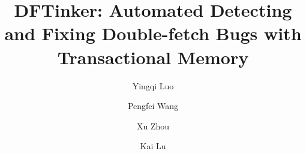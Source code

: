 \documentclass[10pt]{llncs}
\begin{document}
\title{DFTinker: Automated Detecting and Fixing Double-fetch Bugs with Transactional Memory}




\author{
Yingqi Luo \and
Pengfei Wang \and
Xu Zhou \and
Kai Lu}


\maketitle
\end{document}
